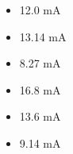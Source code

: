 \begin{itemize}
\item{} 12.0 mA
\vskip 5pt 
\item{} 13.14 mA
\vskip 5pt 
\item{} 8.27 mA
\vskip 5pt 
\item{} 16.8 mA
\vskip 5pt 
\item{} 13.6 mA
\vskip 5pt 
\item{} 9.14 mA
\end{itemize}




